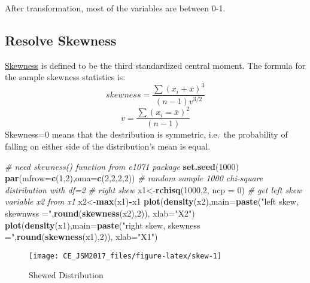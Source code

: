 \documentclass[
]{article}
\newenvironment{Shaded}{\begin{snugshade}}{\end{snugshade}}
\newcommand{\CommentTok}[1]{\textcolor[rgb]{0.56,0.35,0.01}{\textit{#1}}}
\newcommand{\DataTypeTok}[1]{\textcolor[rgb]{0.13,0.29,0.53}{#1}}
\newcommand{\DecValTok}[1]{\textcolor[rgb]{0.00,0.00,0.81}{#1}}
\newcommand{\KeywordTok}[1]{\textcolor[rgb]{0.13,0.29,0.53}{\textbf{#1}}}
\newcommand{\NormalTok}[1]{#1}
\newcommand{\OperatorTok}[1]{\textcolor[rgb]{0.81,0.36,0.00}{\textbf{#1}}}
\newcommand{\StringTok}[1]{\textcolor[rgb]{0.31,0.60,0.02}{#1}}
\begin{document}
After transformation, most of the variables are between 0-1.

\hypertarget{resolve-skewness}{%
\subsection{Resolve Skewness}\label{resolve-skewness}}

\href{https://en.wikipedia.org/wiki/Skewness}{Skewness} is defined to be
the third standardized central moment. The formula for the sample
skewness statistics is:
\[ skewness=\frac{\sum(x_{i}+\bar{x})^{3}}{(n-1)v^{3/2}}\]
\[v=\frac{\sum(x_{i}=\bar{x})^{2}}{(n-1)}\] Skewness=0 means that the
destribution is symmetric, i.e.~the probability of falling on either
side of the distribution's mean is equal.

\begin{Shaded}
\begin{Highlighting}[]
\CommentTok{# need skewness() function from e1071 package}
\KeywordTok{set.seed}\NormalTok{(}\DecValTok{1000}\NormalTok{)}
\KeywordTok{par}\NormalTok{(}\DataTypeTok{mfrow=}\KeywordTok{c}\NormalTok{(}\DecValTok{1}\NormalTok{,}\DecValTok{2}\NormalTok{),}\DataTypeTok{oma=}\KeywordTok{c}\NormalTok{(}\DecValTok{2}\NormalTok{,}\DecValTok{2}\NormalTok{,}\DecValTok{2}\NormalTok{,}\DecValTok{2}\NormalTok{))}
\CommentTok{# random sample 1000 chi-square distribution with df=2}
\CommentTok{# right skew}
\NormalTok{x1<-}\KeywordTok{rchisq}\NormalTok{(}\DecValTok{1000}\NormalTok{,}\DecValTok{2}\NormalTok{, }\DataTypeTok{ncp =} \DecValTok{0}\NormalTok{)}
\CommentTok{# get left skew variable x2 from x1}
\NormalTok{x2<-}\KeywordTok{max}\NormalTok{(x1)}\OperatorTok{-}\NormalTok{x1}
\KeywordTok{plot}\NormalTok{(}\KeywordTok{density}\NormalTok{(x2),}\DataTypeTok{main=}\KeywordTok{paste}\NormalTok{(}\StringTok{"left skew, skewnwss ="}\NormalTok{,}\KeywordTok{round}\NormalTok{(}\KeywordTok{skewness}\NormalTok{(x2),}\DecValTok{2}\NormalTok{)), }\DataTypeTok{xlab=}\StringTok{"X2"}\NormalTok{)}
\KeywordTok{plot}\NormalTok{(}\KeywordTok{density}\NormalTok{(x1),}\DataTypeTok{main=}\KeywordTok{paste}\NormalTok{(}\StringTok{"right skew, skewness ="}\NormalTok{,}\KeywordTok{round}\NormalTok{(}\KeywordTok{skewness}\NormalTok{(x1),}\DecValTok{2}\NormalTok{)), }\DataTypeTok{xlab=}\StringTok{"X1"}\NormalTok{)}
\end{Highlighting}
\end{Shaded}

\begin{figure}

{\centering \texttt{[image: CE\_JSM2017\_files/figure-latex/skew-1]} 

}

\caption{Shewed Distribution}\label{fig:skew}
\end{figure}
\end{document}
